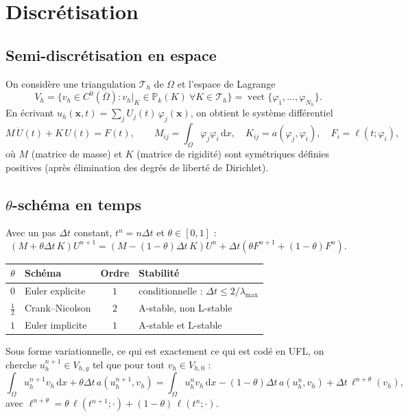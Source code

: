 \documentclass[11pt,a4paper]{article}
\newcommand{\dd}{\,\mathrm{d}}
\newcommand{\Pk}{\mathbb{P}_k}
\begin{document}
\section{Discrétisation}
\subsection{Semi-discrétisation en espace}
On considère une triangulation $\mathcal{T}_h$ de $\Omega$ et l'espace de Lagrange
\[
  V_h = \{ v_h \in C^0(\overline\Omega) : v_h|_K \in \Pk(K)\ \forall K\in\mathcal{T}_h \}
  = \operatorname{vect}\{\varphi_1,\dots,\varphi_{N_h}\}.
\]
En écrivant $u_h(\bm{x},t) = \sum_j U_j(t)\,\varphi_j(\bm{x})$, on obtient le système différentiel
\begin{equation}\label{eq:semidiscrete}
  M\,\dot{U}(t) + K\,U(t) = F(t), \qquad
  M_{ij} = \int_\Omega \varphi_j\varphi_i\dd x, \quad K_{ij} = a(\varphi_j,\varphi_i), \quad F_i = \ell(t;\varphi_i),
\end{equation}
où $M$ (matrice de masse) et $K$ (matrice de rigidité) sont symétriques définies positives
(après élimination des degrés de liberté de Dirichlet).

\subsection{\texorpdfstring{$\theta$}{theta}-schéma en temps}\label{sec:theta}
Avec un pas $\Delta t$ constant, $t^n = n\Delta t$ et $\theta\in[0,1]$ :
\begin{equation}\label{eq:theta}
  \boxed{\left(M + \theta\Delta t\,K\right) U^{n+1}
  = \left(M - (1-\theta)\Delta t\,K\right) U^{n}
  + \Delta t\left(\theta F^{n+1} + (1-\theta) F^{n}\right).}
\end{equation}
\begin{center}
\begin{tabular}{c l c l}\toprule
$\theta$ & Schéma & Ordre & Stabilité \\ \midrule
$0$ & Euler explicite & $1$ & conditionnelle : $\Delta t \le 2/\lambda_{\max}$ \\
$\tfrac12$ & Crank--Nicolson & $2$ & A-stable, non L-stable \\
$1$ & Euler implicite & $1$ & A-stable et L-stable \\ \bottomrule
\end{tabular}
\end{center}
Sous forme variationnelle, ce qui est exactement ce qui est codé en UFL, on cherche $u_h^{n+1}\in V_{h,g}$ tel que
pour tout $v_h \in V_{h,0}$ :
\begin{equation}\label{eq:theta_weak}
  \int_\Omega u_h^{n+1} v_h \dd x + \theta\Delta t\, a(u_h^{n+1},v_h)
  = \int_\Omega u_h^{n} v_h \dd x - (1-\theta)\Delta t\, a(u_h^{n},v_h)
  + \Delta t\, \ell^{n+\theta}(v_h),
\end{equation}
avec $\ell^{n+\theta} = \theta\,\ell(t^{n+1};\cdot) + (1-\theta)\,\ell(t^n;\cdot)$.
\end{document}
